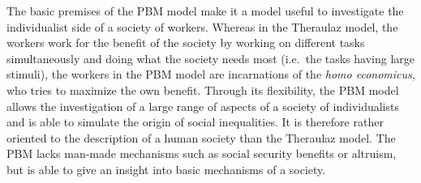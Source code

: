 
The basic premises of the PBM model make it a model useful to investigate the individualist side of a society of workers. Whereas in the Theraulaz model, the workers work for the benefit of the society by working on different tasks simultaneously and doing what the society needs most (i.e.\ the tasks having large stimuli), the workers in the PBM model are incarnations of the \emph{homo economicus}, who tries to maximize the own benefit. Through its flexibility, the PBM model allows the investigation of a large range of aspects of a society of individualists and is able to simulate the origin of social inequalities. It is therefore rather oriented to the description of a human society than the Theraulaz model.
The PBM lacks man-made mechanisms such as social security benefits or altruism, but is able to give an insight into basic mechanisms of a society.
